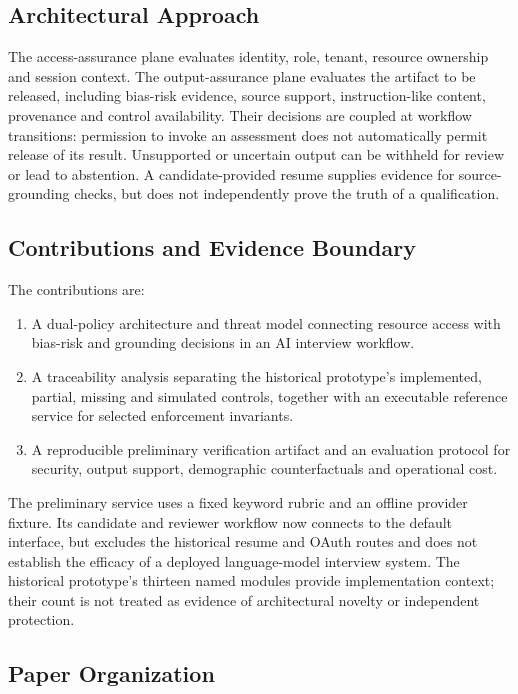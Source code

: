 \documentclass[conference]{IEEEtran}
\begin{document}
\subsection{Architectural Approach}

The access-assurance plane evaluates identity, role, tenant, resource ownership and session context. The output-assurance plane evaluates the artifact to be released, including bias-risk evidence, source support, instruction-like content, provenance and control availability. Their decisions are coupled at workflow transitions: permission to invoke an assessment does not automatically permit release of its result. Unsupported or uncertain output can be withheld for review or lead to abstention. A candidate-provided resume supplies evidence for source-grounding checks, but does not independently prove the truth of a qualification.

\subsection{Contributions and Evidence Boundary}

The contributions are:
\begin{enumerate}
\item A dual-policy architecture and threat model connecting resource access with bias-risk and grounding decisions in an AI interview workflow.
\item A traceability analysis separating the historical prototype's implemented, partial, missing and simulated controls, together with an executable reference service for selected enforcement invariants.
\item A reproducible preliminary verification artifact and an evaluation protocol for security, output support, demographic counterfactuals and operational cost.
\end{enumerate}

The preliminary service uses a fixed keyword rubric and an offline provider fixture. Its candidate and reviewer workflow now connects to the default interface, but excludes the historical resume and OAuth routes and does not establish the efficacy of a deployed language-model interview system. The historical prototype's thirteen named modules provide implementation context; their count is not treated as evidence of architectural novelty or independent protection.

\subsection{Paper Organization}
\end{document}
